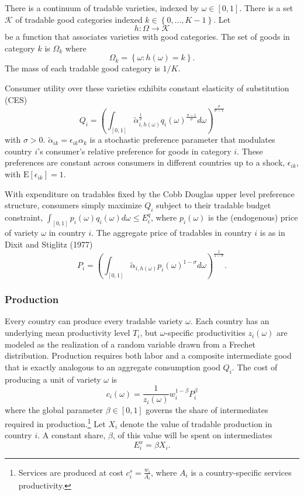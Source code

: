 \documentclass{puthesis}
\newcommand{\E}{\mathrm{E}}
\begin{document}
There is a continuum of tradable varieties, indexed by
\(\omega \in [0, 1]\). There is a set \(\mathcal{K}\) of tradable good
categories indexed \(k \in \left\{ 0, ..., K - 1 \right\}\). Let \[
h : \Omega \rightarrow \mathcal{K}
\] be a function that associates varieties with good categories. The set
of goods in category \(k\) is \(\Omega_k\) where \[
\Omega_k = \left\{ \omega : h(\omega) = k \right\} .
\] The mass of each tradable good category is \(1 / K\).

Consumer utility over these varieties exhibits constant elasticity of
substitution (CES) \begin{equation} \label{eq:CES}
Q_i = \left( \int_{[0,1]} \tilde{\alpha}_{i, h(\omega)}^{\frac{1}{\sigma}} q_i(\omega)^{\frac{\sigma - 1}{\sigma}} d \omega \right)^{\frac{\sigma}{\sigma - 1}}
\end{equation} with \(\sigma > 0\).
\(\tilde{\alpha}_{ik} = \epsilon_{ik} \alpha_k\) is a stochastic
preference parameter that modulates country \(i\)'s consumer's relative
preference for goods in category \(i\). These preferences are constant
across consumers in different countries up to a shock,
\(\epsilon_{ik}\), with \(\E [ \epsilon_{ik} ] = 1\).

With expenditure on tradables fixed by the Cobb Douglas upper level
preference structure, consumers simply maximize \(Q_i\) subject to their
tradable budget constraint,
\(\int_{[0,1]} p_i(\omega) q_i(\omega) d \omega \leq E_i^q\), where
\(p_i(\omega)\) is the (endogenous) price of variety \(\omega\) in
country \(i\). The aggregate price of tradables in country \(i\) is as
in Dixit and Stiglitz (1977) \begin{equation} \label{eq:P}
P_i = \left( \int_{[0,1]} \tilde{\alpha}_{i, h(\omega)} p_i(\omega)^{1 - \sigma} d \omega \right)^{\frac{1}{1 - \sigma}} .
\end{equation}

\subsubsection{Production}

Every country can produce every tradable variety \(\omega\). Each
country has an underlying mean productivity level \(T_i\), but
\(\omega\)-specific productivities \(z_i(\omega)\) are modeled as the
realization of a random variable drawn from a Frechet distribution.
Production requires both labor and a composite intermediate good that is
exactly analogous to an aggregate consumption good \(Q_i\). The cost of
producing a unit of variety \(\omega\) is \begin{equation} \label{eq:c}
c_i(\omega) = \frac{1}{z_i(\omega)} w_i^{1 - \beta} P_i^{\beta}
\end{equation} where the global parameter \(\beta \in [0, 1]\) governs
the share of intermediates required in production.\footnote{Services are
  produced at cost \(c_i^s = \frac{w_i}{A_i}\), where \(A_i\) is a
  country-specific services productivity.} Let \(X_i\) denote the value
of tradable production in country \(i\). A constant share, \(\beta\), of
this value will be spent on intermediates \[
E_i^x = \beta X_i .
\]
\end{document}
